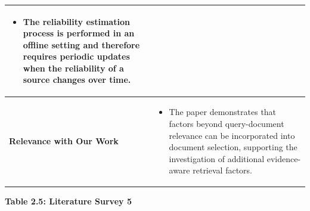 \documentclass[12pt,a4paper]{report}
\begin{document}
\begin{longtable}{|p{1.25in}|p{5.15in}|}
\begin{itemize}[
    leftmargin=0.18in,
    itemsep=0.05in,
    topsep=0pt,
    parsep=0pt
]
    \item The reliability estimation process is performed in an offline setting and therefore requires periodic updates when the reliability of a source changes over time.
\end{itemize}
\\ \hline

\textbf{Relevance with Our Work} &
\begin{itemize}[
    leftmargin=0.18in,
    itemsep=0.05in,
    topsep=0pt,
    parsep=0pt
]
    \item The paper demonstrates that factors beyond query-document relevance can be incorporated into document selection, supporting the investigation of additional evidence-aware retrieval factors.
\end{itemize}
\\ \hline

\end{longtable}

\clearpage


\begin{center}
\textbf{Table 2.5: Literature Survey 5}
\end{center}
\end{document}
